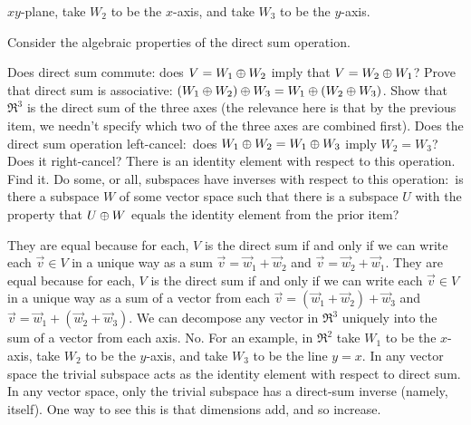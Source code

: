 \begin{exercises}
\begin{answer}
\begin{exparts}
          \( xy \)-plane, take \( W_2 \) to be the \( x \)-axis, 
          and take \( W_3 \) to be the \( y \)-axis.  
      \end{exparts}
     \end{answer}
  \item 
    Consider the algebraic properties of the direct sum operation.
    \begin{exparts}
       \partsitem Does direct sum commute: does \( V=W_1\oplus W_2 \) imply
         that \( V=W_2\oplus W_1 \)?
      \partsitem Prove that direct sum is associative:
        \( (W_1\oplus W_2)\oplus W_3=
            W_1\oplus(W_2\oplus W_3) \).
       \partsitem Show that \( \Re^3 \) is the direct sum of the three axes
         (the relevance here is that by the previous item,
          we needn't specify which two of the three axes are combined first).
       \partsitem Does the direct sum operation left-cancel:~does
         \( W_1\oplus W_2=W_1\oplus W_3 \) imply \( W_2=W_3 \)?
         Does it right-cancel?
       \partsitem There is an identity element with respect to this operation.
         Find it.
       \partsitem Do some, or all, subspaces have inverses with respect to this
         operation:~is there a subspace \( W \) of some vector space such
         that there is a subspace \( U \) with the property that
         \( U\oplus W \) equals the identity element from
         the prior item?
    \end{exparts}
    \begin{answer}
      \begin{exparts}
         \partsitem They are equal because for each, 
           \( V \) is the direct sum if
           and only if we can write each \( \vec{v}\in V \) in a unique
           way as a sum \( \vec{v}=\vec{w}_1+\vec{w}_2 \) and
           \( \vec{v}=\vec{w}_2+\vec{w}_1 \).
         \partsitem They are equal because for each, 
           \( V \) is the direct sum if
           and only if we can write each \( \vec{v}\in V \) in a unique
           way as a sum of a vector from each
           $\vec{v}=(\vec{w}_1+\vec{w}_2)+\vec{w}_3$
           and $\vec{v}=\vec{w}_1+(\vec{w}_2+\vec{w}_3)$.
         \partsitem We can decompose any vector in \( \Re^3 \) uniquely into
           the sum of a vector from each axis.
         \partsitem No.
           For an example, in \( \Re^2 \) take \( W_1 \) to be the
           \( x \)-axis, take \( W_2 \) to be the \( y \)-axis, and
           take \( W_3 \) to be the line \( y=x \).
         \partsitem In any vector space the trivial subspace acts as 
           the identity element with respect to direct sum.
         \partsitem In any vector space, only the trivial subspace has
           a direct-sum inverse (namely, itself).
           One way to see this is that dimensions add, and so increase.
      \end{exparts}  
     \end{answer}
\end{exercises}
